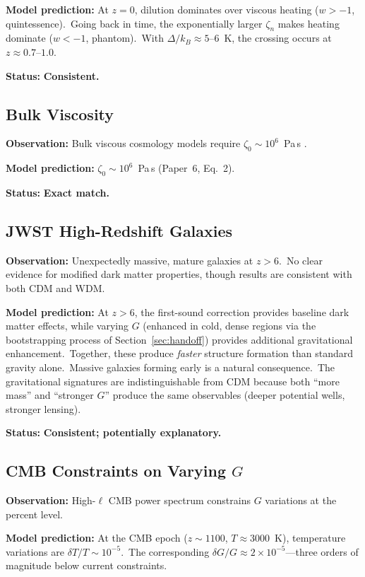 \documentclass[12pt,letterpaper]{article}
\begin{document}
\textbf{Model prediction:} At $z = 0$, dilution dominates over viscous heating
($w > -1$, quintessence).\ Going back in time, the exponentially larger
$\zeta_n$ makes heating dominate ($w < -1$, phantom).\ With $\Delta/k_B \approx
5$--$6$~K, the crossing occurs at $z \approx 0.7$--$1.0$.

\textbf{Status:} \textbf{Consistent.}


\subsection{Bulk Viscosity}

\textbf{Observation:} Bulk viscous cosmology models require $\zeta_0 \sim
10^6$~Pa\,s \cite{viscous2025}.

\textbf{Model prediction:} $\zeta_0 \sim 10^6$~Pa\,s (Paper~6, Eq.~2).

\textbf{Status:} \textbf{Exact match.}


\subsection{JWST High-Redshift Galaxies}

\textbf{Observation:} Unexpectedly massive, mature galaxies at $z > 6$.\ No
clear evidence for modified dark matter properties, though results are
consistent with both CDM and WDM.

\textbf{Model prediction:} At $z > 6$, the first-sound correction provides
baseline dark matter effects, while varying $G$ (enhanced in cold, dense
regions via the bootstrapping process of Section~\ref{sec:handoff})
provides additional gravitational enhancement.\ Together, these produce
\emph{faster} structure formation than standard gravity alone.\ Massive
galaxies forming early is a natural consequence.\ The gravitational signatures
are indistinguishable from CDM because both ``more mass'' and ``stronger $G$''
produce the same observables (deeper potential wells, stronger lensing).

\textbf{Status:} \textbf{Consistent; potentially explanatory.}


\subsection{CMB Constraints on Varying \texorpdfstring{$G$}{G}}

\textbf{Observation:} High-$\ell$ CMB power spectrum constrains $G$ variations
at the percent level.

\textbf{Model prediction:} At the CMB epoch ($z \sim 1100$, $T \approx 3000$~K),
temperature variations are $\delta T/T \sim 10^{-5}$.\ The corresponding
$\delta G/G \approx 2 \times 10^{-5}$---three orders of magnitude below
current constraints.
\end{document}
